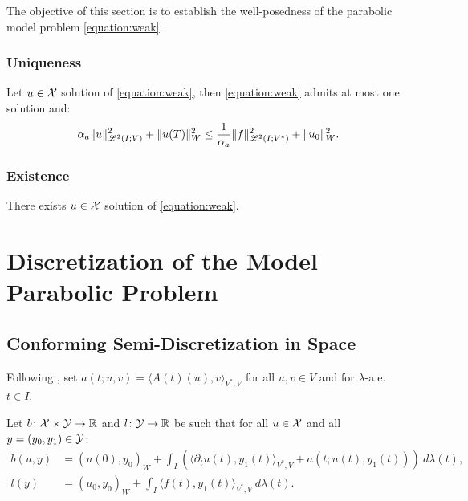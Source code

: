 The objective of this section is to establish the well-posedness of the parabolic model problem \cref{equation:weak}.

\subsubsection{Uniqueness}

\begin{lemma}
    Let $u \in \mathcal{X}$ solution of \cref{equation:weak}, then \cref{equation:weak} admits at most one solution and:
    \begin{align}
        \alpha_{a} \lVert u \rVert_{\mathscr{L}^{2}(I; V)}^2 + \lVert u(T) \rVert_W^2 \leq \frac{1}{\alpha_{a}} \lVert f \rVert_{\mathscr{L}^{2}(I; V^*)}^2 + \lVert u_0 \rVert_W^2.
    \end{align}
\end{lemma}



\subsubsection{Existence}

\begin{lemma}[Existence]
    There exists $u \in \mathcal{X}$ solution of \cref{equation:weak}.
\end{lemma}


\newpage
\section{Discretization of the Model Parabolic Problem}

\subsection{Conforming Semi-Discretization in Space}

Following \cite[p.~135]{Ern2021}, set $a(t; u, v) = \langle A(t)(u), v \rangle_{V^*, V}$ for all $u, v \in V$ and for $\lambda$-a.e. $t \in I$.

\begin{definition}[$b$ and $l$]
    Let $b \colon \mathcal{X} \times \mathcal{Y} \rightarrow \mathbb{R}$ and $l \colon \mathcal{Y} \rightarrow \mathbb{R}$ be such that for all $u \in \mathcal{X}$ and all $y = (y_0, y_1) \in \mathcal{Y}$:
    \begin{align}
        b(u, y) &= \left( u(0), y_0 \right)_W + \int_I \left( \langle \partial_t u(t), y_1(t) \rangle_{V^*, V} + a(t; u(t), y_1(t)) \right)~ d \lambda(t), \\
        l(y) &= \left( u_0, y_0 \right)_W + \int_I \langle f(t), y_1(t) \rangle_{V^*, V} ~ d \lambda(t).
    \end{align}
\end{definition}


